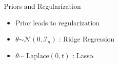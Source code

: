 \documentclass{beamer}
\begin{document}
\begin{frame}{Priors and Regularization}
\begin{itemize}
    \item Prior leads to regularization
    \item $\theta \stackrel{}{\sim} \mathcal{N}(0, \mathcal{I}_n)$ : Ridge Regression
    \item $\theta \stackrel{}{\sim}\text{ Laplace}(0, t)$ : Lasso.
\end{itemize}
    
\end{frame}

	


	
\end{document}
